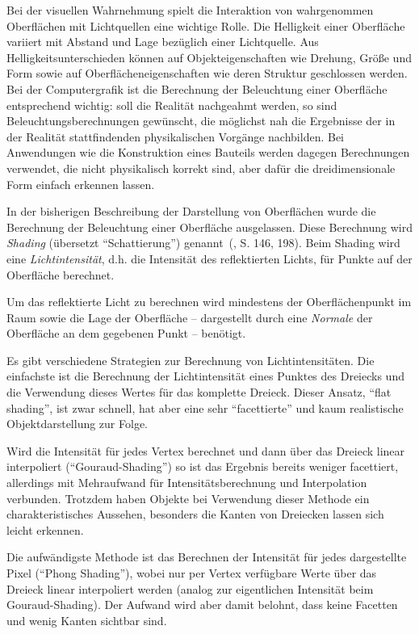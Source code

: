 \documentclass[twoside,a4paper,fleqn,12pt]{article}
\begin{document}
Bei der visuellen Wahrnehmung spielt die Interaktion von wahrgenommen Oberflächen mit Lichtquellen eine wichtige
Rolle. Die Helligkeit einer Oberfläche variiert mit Abstand und Lage bezüglich einer Lichtquelle. 
Aus Helligkeitsunterschieden können auf Objekteigenschaften wie Drehung, Größe und Form sowie auf Oberflächeneigenschaften
wie deren Struktur geschlossen werden. Bei der Computergrafik ist die Berechnung der Beleuchtung einer Oberfläche
entsprechend wichtig: soll die Realität nachgeahmt werden, so sind Beleuchtungsberechnungen gewünscht, die möglichst
nah die Ergebnisse der in der Realität stattfindenden physikalischen Vorgänge nachbilden. Bei Anwendungen wie die
Konstruktion eines Bauteils werden dagegen Berechnungen verwendet, die nicht physikalisch korrekt sind, aber dafür
die dreidimensionale Form einfach erkennen lassen.

In der bisherigen Beschreibung der Darstellung von Oberflächen wurde die Berechnung der Beleuchtung einer
Oberfläche ausgelassen. Diese Berechnung wird \emph{Shading} (übersetzt "`Schattierung"') genannt~(\cite{watt_de}, S. 146, 198).
Beim Shading wird eine \emph{Lichtintensität}, d.h. die Intensität des reflektierten Lichts, für Punkte auf der
Oberfläche berechnet.

Um das reflektierte Licht zu berechnen wird mindestens der Oberflächenpunkt im Raum sowie die Lage der Oberfläche
-- dargestellt durch eine \emph{Normale} der Oberfläche an dem gegebenen Punkt -- benötigt.

Es gibt verschiedene Strategien zur Berechnung von Lichtintensitäten. Die einfachste ist die Berechnung der Lichtintensität
eines Punktes des Dreiecks und die Verwendung dieses Wertes für das komplette Dreieck. Dieser Ansatz, ``flat shading'',
ist zwar schnell, hat aber eine sehr "`facettierte"' und kaum realistische Objektdarstellung zur Folge.

Wird die Intensität für jedes Vertex berechnet und dann über das Dreieck linear interpoliert ("`Gouraud-Shading"') so ist
das Ergebnis bereits weniger facettiert, allerdings mit Mehraufwand für Intensitätsberechnung und Interpolation verbunden.
Trotzdem haben Objekte bei Verwendung dieser Methode ein charakteristisches Aussehen, besonders die Kanten von Dreiecken lassen sich leicht erkennen.

Die aufwändigste Methode ist das Berechnen der Intensität für jedes dargestellte Pixel ("`Phong Shading"'), wobei
nur per Vertex verfügbare Werte über das Dreieck linear interpoliert werden (analog zur eigentlichen Intensität beim
Gouraud-Shading). Der Aufwand wird aber damit belohnt, dass keine Facetten und wenig Kanten sichtbar sind.
\end{document}
